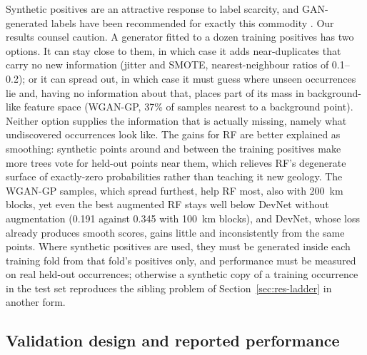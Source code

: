 \documentclass[pdflatex,sn-apa]{sn-jnl}
\begin{document}
Synthetic positives are an attractive response to label scarcity, and GAN-generated labels have been recommended for exactly this commodity \citep{Parsa2025}. Our results counsel caution. A generator fitted to a dozen training positives has two options. It can stay close to them, in which case it adds near-duplicates that carry no new information (jitter and SMOTE, nearest-neighbour ratios of 0.1--0.2); or it can spread out, in which case it must guess where unseen occurrences lie and, having no information about that, places part of its mass in background-like feature space (WGAN-GP, 37\% of samples nearest to a background point). Neither option supplies the information that is actually missing, namely what undiscovered occurrences look like. The gains for RF are better explained as smoothing: synthetic points around and between the training positives make more trees vote for held-out points near them, which relieves RF's degenerate surface of exactly-zero probabilities rather than teaching it new geology. The WGAN-GP samples, which spread furthest, help RF most, also with 200~km blocks, yet even the best augmented RF stays well below DevNet without augmentation (0.191 against 0.345 with 100~km blocks), and DevNet, whose loss already produces smooth scores, gains little and inconsistently from the same points. Where synthetic positives are used, they must be generated inside each training fold from that fold's positives only, and performance must be measured on real held-out occurrences; otherwise a synthetic copy of a training occurrence in the test set reproduces the sibling problem of Section~\ref{sec:res-ladder} in another form.

\subsection{Validation design and reported performance}\label{sec:disc-protocol}
\end{document}
